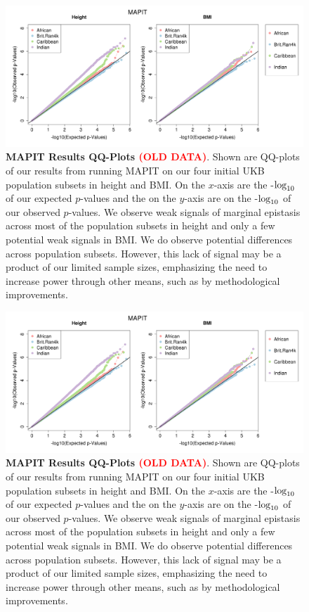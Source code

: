 \documentclass[12pt, a4paper]{article}
\def\log{{\rm log}}
\newcommand{\red}[1]{\textcolor{red}{#1}}
\begin{document}
\begin{figure}[htbp]
\centering
\includegraphics[scale=.35]{Images/InterPath_Main_Figure_MAPIT_vs1.png}
\caption[TBD]{\textbf{MAPIT Results QQ-Plots \red{(OLD DATA)}}. Shown are QQ-plots of our results from running MAPIT on our four initial UKB population subsets in height and BMI. On the $x$-axis are the -$\log_{10}$ of our expected $p$-values and the on the $y$-axis are on the -$\log_{10}$ of our observed $p$-values. We observe weak signals of marginal epistasis across most of the population subsets in height and only a few potential weak signals in BMI. We do observe potential differences across population subsets. However, this lack of signal may be a product of our limited sample sizes, emphasizing the need to increase power through other means, such as by methodological improvements.}
\label{InterPath-Main-Figure-IBS-African}
\end{figure}

\begin{figure}[htbp]
\centering
\includegraphics[scale=.35]{Images/InterPath_Main_Figure_MAPIT_vs1.png}
\caption[TBD]{\textbf{MAPIT Results QQ-Plots \red{(OLD DATA)}}. Shown are QQ-plots of our results from running MAPIT on our four initial UKB population subsets in height and BMI. On the $x$-axis are the -$\log_{10}$ of our expected $p$-values and the on the $y$-axis are on the -$\log_{10}$ of our observed $p$-values. We observe weak signals of marginal epistasis across most of the population subsets in height and only a few potential weak signals in BMI. We do observe potential differences across population subsets. However, this lack of signal may be a product of our limited sample sizes, emphasizing the need to increase power through other means, such as by methodological improvements.}
\label{InterPath-Main-Figure-IBS-AllPops}
\end{figure}
\end{document}
